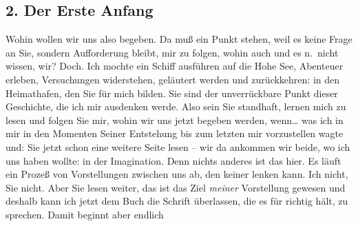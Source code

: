 \documentclass[
]{article}
\author{}
\date{\vspace{-2.5em}}
\begin{document}
\subsection{2. Der Erste Anfang}\label{der-erste-anfang}

Wohin wollen wir uns also begeben. Da muß ein Punkt stehen, weil es
keine Frage an Sie, sondern Aufforderung bleibt, mir zu folgen, wohin
auch und es n.~nicht wissen, wir? Doch. Ich mochte ein Schiff ausführen
auf die Hohe See, Abenteuer erleben, Versuchungen widerstehen, geläutert
werden und zurückkehren: in den Heimathafen, den Sie für mich bilden.
Sie sind der unverrückbare Punkt dieser Geschichte, die ich mir
ausdenken werde. Also sein Sie standhaft, lernen mich zu lesen und
folgen Sie mir, wohin wir uns jetzt begeben werden, wenn\ldots{} was ich
in mir in den Momenten Seiner Entstehung bis zum letzten mir
vorzustellen wagte und: Sie jetzt schon eine weitere Seite lesen -- wir
da ankommen wir beide, wo ich uns haben wollte: in der Imagination. Denn
nichts anderes ist das hier. Es läuft ein Prozeß von Vorstellungen
zwischen uns ab, den keiner lenken kann. Ich nicht, Sie nicht. Aber Sie
lesen weiter, das ist das Ziel \emph{meiner }Vorstellung gewesen und
deshalb kann ich jetzt dem Buch die Schrift überlassen, die es für
richtig hält, zu sprechen. Damit beginnt aber endlich
\end{document}
